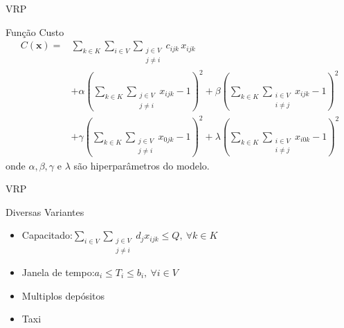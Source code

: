 \documentclass[xcolor={dvipsnames,table}]{beamer}
\begin{document}
\begin{frame}{VRP}
    \begin{block}{Função Custo}
        \begin{equation*}
            \begin{aligned}
                C(\mathbf{x})= & \sum_{k\in K}\sum_{i \in V} \sum_{\substack{j \in V \\ j \neq i}} c_{ijk}\, x_{ijk}  \\
                & + \alpha\left(\sum_{k\in K}\sum_{\substack{j \in V \\ j \neq i}}x_{ijk}-1\right)^2 + \beta\left( \sum_{k\in K}\sum_{\substack{i \in V \\ i \neq j}}x_{ijk}-1\right)^2 \\
                & + \gamma\left(\sum_{k\in K}\sum_{\substack{j \in V \\ j \neq i}}x_{0jk}-1\right)^2 + \lambda\left( \sum_{k\in K}\sum_{\substack{i \in V \\ i \neq j}}x_{i0k}-1\right)^2
            \end{aligned}
        \end{equation*}
        onde $\alpha, \beta, \gamma$ e $\lambda$ são hiperparâmetros do modelo.
    \end{block}
    
\end{frame}


\begin{frame}{VRP}
    \begin{block}{Diversas Variantes}
        \begin{itemize}
            \item Capacitado:\quad $\sum_{i\in V}\sum_{\substack{j\in V\\j\neq i}}d_jx_{ijk}\leq Q,\ \forall k\in K$
            \item Janela de tempo:\quad $a_i\leq T_i\leq b_i,\ \forall i\in V$
            \item Multiplos depósitos
            \item Taxi 
        \end{itemize}
    \end{block}
\end{frame}

\end{document}
